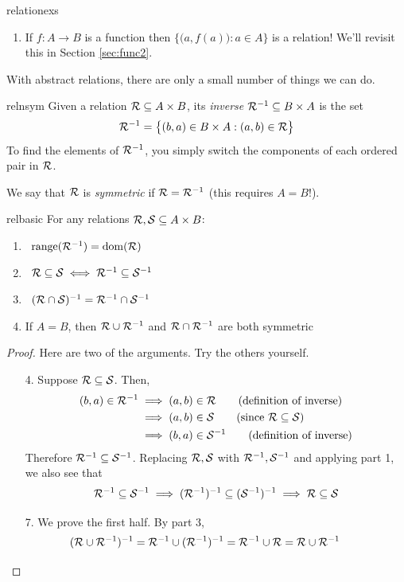 \begin{examples}{}{relationexs}
\begin{enumerate}
	  \item\label{ex:relationexs7} If $f:A\to B$ is a function then $\bigl\{\bigl(a,f(a)\bigr):a\in A\bigr\}$ is a relation! We'll revisit this in Section \ref{sec:func2}.
	\end{enumerate}
\end{examples}

\goodbreak

With abstract relations, there are only a small number of things we can do.

\begin{defn}{}{relnsym}
	Given a relation $\mathcal{R}\subseteq A\times B$, its \emph{inverse} $\mathcal{R}^{-1}\subseteq B\times A$ is the set
	\[
		\mathcal{R}^{-1}=\bigl\{(b,a)\in B\times A:(a,b)\in\mathcal{R}\bigr\}
	\]
	To find the elements of $\mathcal{R}^{-1}$, you simply switch the components of each ordered pair in $\mathcal{R}$.\par
	We say that $\mathcal{R}$ is \emph{symmetric} if $\mathcal{R}=\mathcal{R}^{-1}$ (this requires $A=B$!).
\end{defn}

\begin{thm}{}{relbasic}
	For any relations $\mathcal{R},\mathcal{S}\subseteq A\times B$:
	\begin{enumerate}\itemsep2pt
	  \item {} \ $\operatorname{range}(\mathcal{R}^{-1})=\operatorname{dom}(\mathcal{R})$
		\setcounter{enumi}{2}
		\item {} \ $\mathcal{R}\subseteq \mathcal{S}\iff \mathcal{R}^{-1}\subseteq \mathcal{S}^{-1}$
		\setcounter{enumi}{4}
		\item {} \ $(\mathcal{R}\cap \mathcal{S})^{-1}=\mathcal{R}^{-1}\cap \mathcal{S}^{-1}$
		\setcounter{enumi}{6}
		\item If $A=B$, then $\mathcal{R}\cup \mathcal{R}^{-1}$ and $\mathcal{R}\cap \mathcal{R}^{-1}$ are both symmetric
	\end{enumerate}
\end{thm}

\begin{proof}
	Here are two of the arguments. Try the others yourself.
	\begin{enumerate}\itemsep0pt
		\item[4.] Suppose $\mathcal{R}\subseteq\mathcal{S}$. Then,
		\begin{align*}
			(b,a)\in\cR^{-1}&\implies (a,b)\in\cR \tag{definition of inverse}\\
			&\implies (a,b)\in\cS \tag{since $\cR\subseteq\cS$}\\
			&\implies (b,a)\in\cS^{-1} \tag{definition of inverse}
		\end{align*}
		Therefore $\mathcal{R}^{-1}\subseteq\mathcal{S}^{-1}$. Replacing $\mathcal{R},\mathcal{S}$ with $\mathcal{R}^{-1},\mathcal{S}^{-1}$ and applying part 1, we also see that
		\[
			\mathcal{R}^{-1}\subseteq\mathcal{S}^{-1}\implies (\mathcal{R}^{-1})^{-1}\subseteq (\mathcal{S}^{-1})^{-1} \implies \mathcal{R}\subseteq \mathcal{S}
		\]
		\item[7.] We prove the first half. By part 3,
		\[
			(\mathcal{R}\cup \mathcal{R}^{-1})^{-1}=\mathcal{R}^{-1}\cup (\mathcal{R}^{-1})^{-1}=\mathcal{R}^{-1}\cup \mathcal{R}=\mathcal{R}\cup \mathcal{R}^{-1} \tag*{\qedhere}
		\]
	\end{enumerate}
\end{proof}


